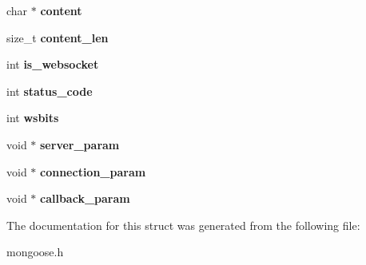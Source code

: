 \begin{DoxyCompactItemize}
\item 
\hypertarget{structmg__connection_a817740e63b59b7c45685f1cdb987f98c}{char $\ast$ {\bfseries content}}\label{structmg__connection_a817740e63b59b7c45685f1cdb987f98c}

\item 
\hypertarget{structmg__connection_a6e7a6042a40453587cfca0d325a30601}{size\-\_\-t {\bfseries content\-\_\-len}}\label{structmg__connection_a6e7a6042a40453587cfca0d325a30601}

\item 
\hypertarget{structmg__connection_ad1642e1e64e670e8af715a5aad9e06b0}{int {\bfseries is\-\_\-websocket}}\label{structmg__connection_ad1642e1e64e670e8af715a5aad9e06b0}

\item 
\hypertarget{structmg__connection_ae0163f2496aed16dc972e2139b66bb93}{int {\bfseries status\-\_\-code}}\label{structmg__connection_ae0163f2496aed16dc972e2139b66bb93}

\item 
\hypertarget{structmg__connection_a022231787b07741122d408e9a42a2452}{int {\bfseries wsbits}}\label{structmg__connection_a022231787b07741122d408e9a42a2452}

\item 
\hypertarget{structmg__connection_a1d8ed96e79904e61cbcaa85812c040a8}{void $\ast$ {\bfseries server\-\_\-param}}\label{structmg__connection_a1d8ed96e79904e61cbcaa85812c040a8}

\item 
\hypertarget{structmg__connection_abd930cc6bad9df41986f7c63bddd1d47}{void $\ast$ {\bfseries connection\-\_\-param}}\label{structmg__connection_abd930cc6bad9df41986f7c63bddd1d47}

\item 
\hypertarget{structmg__connection_a767bf7e481bd80da1beabec5e3880c90}{void $\ast$ {\bfseries callback\-\_\-param}}\label{structmg__connection_a767bf7e481bd80da1beabec5e3880c90}

\end{DoxyCompactItemize}


The documentation for this struct was generated from the following file\-:\begin{DoxyCompactItemize}
\item 
mongoose.\-h\end{DoxyCompactItemize}
